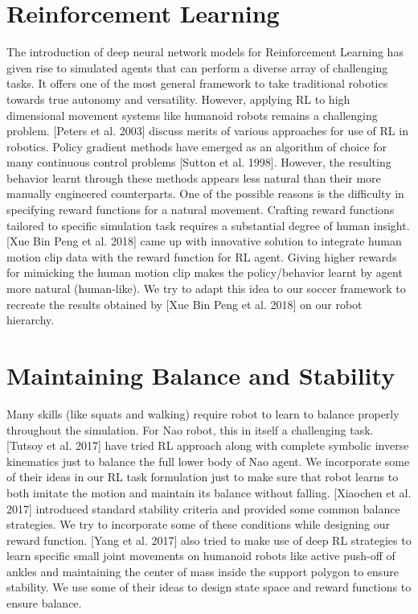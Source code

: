 \section{Reinforcement Learning}
The introduction of deep neural network models for Reinforcement Learning has given rise to simulated agents that can perform a diverse array of challenging tasks. It offers one of the most general framework to take traditional robotics towards true autonomy and versatility. However, applying RL to high dimensional movement
systems like humanoid robots remains a challenging problem. [Peters et al. 2003]\cite{peters2003reinforcement} discuss merits of various approaches for use of RL in robotics. Policy gradient methods have emerged as an algorithm of choice for many continuous control problems [Sutton et al. 1998]\cite{Sutton:1998:IRL:551283}. However, the resulting behavior learnt through these methods appears less natural than their more manually engineered counterparts. One of the possible reasons is the difficulty in specifying reward functions for a natural movement. Crafting reward functions tailored to specific simulation task requires a substantial degree of human insight. [Xue Bin Peng et al. 2018]\cite{Peng:2018:DED:3197517.3201311} came up with innovative solution to integrate human motion clip data with the reward function for RL agent. Giving higher rewards for mimicking the human motion clip makes the policy/behavior learnt by agent more natural (human-like). We try to adapt this idea to our soccer framework to recreate the results obtained by [Xue Bin Peng et al. 2018]\cite{Peng:2018:DED:3197517.3201311} on our robot hierarchy. 

\section{Maintaining Balance and Stability}
Many skills (like squats and walking) require robot to learn to balance properly throughout the simulation. For Nao \cite{usermanual} robot, this in itself a challenging task. [Tutsoy et al. 2017]\cite{tutsoy2017learning} have tried RL approach along with complete symbolic inverse kinematics just to balance the full lower body of Nao agent. We incorporate some of their ideas in our RL task formulation just to make sure that robot learns to both imitate the motion and maintain its balance without falling. [Xiaochen et al. 2017]\cite{laisurvey} introduced standard stability criteria and provided some common balance strategies. We try to incorporate some of these conditions while designing our reward function. [Yang et al. 2017] \cite{yang2017emergence} also tried to make use of deep RL strategies to learn specific small joint movements on humanoid robots like active push-off of ankles and maintaining the center of mass inside the support polygon to ensure stability. We use some of their ideas to design state space and reward functions to ensure balance.       


